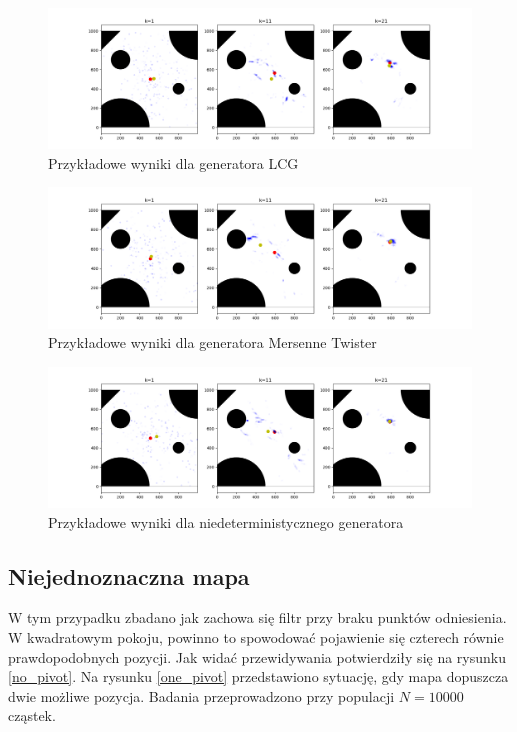 \begin{figure}[H]
	\begin{center}
		\includegraphics[width=15cm]{./lcg_example.png}
		\caption{Przykładowe wyniki dla generatora LCG}
		\label{lcg_example}
	\end{center}
\end{figure}

\begin{figure}[H]
	\begin{center}
		\includegraphics[width=15cm]{./mersenne_example.png}
		\caption{Przykładowe wyniki dla generatora Mersenne Twister}
		\label{mersenne_example}
	\end{center}
\end{figure}

\begin{figure}[H]
\begin{center}
	\includegraphics[width=15cm]{./device_example.png}
	\caption{Przykładowe wyniki dla niedeterministycznego generatora}
	\label{device_example}
\end{center}
\end{figure}


\subsection{Niejednoznaczna mapa}
W tym przypadku zbadano jak zachowa się filtr przy braku punktów odniesienia. W kwadratowym pokoju, powinno to spowodować pojawienie się czterech równie prawdopodobnych pozycji. Jak widać przewidywania potwierdziły się na rysunku \ref{no_pivot}. Na rysunku \ref{one_pivot} przedstawiono sytuację, gdy mapa dopuszcza dwie możliwe pozycja. Badania przeprowadzono przy populacji $N=10000$ cząstek.

